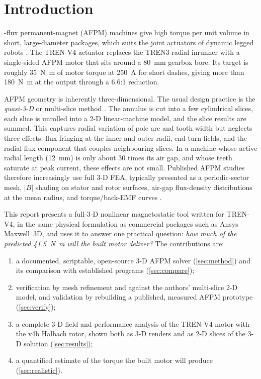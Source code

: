 \documentclass[journal]{IEEEtran}
\newcommand{\Nm}{\si{\newton\metre}}
\begin{document}
\section{Introduction}
-flux permanent-magnet (AFPM) machines give high torque per unit volume in short, large-diameter packages, which suits the joint actuators of dynamic legged robots \cite{gieras2008,aydin2004}. The TREN-V4 actuator replaces the TREN3 radial inrunner with a single-sided AFPM motor that sits around a \SI{80}{mm} gearbox bore. Its target is roughly \SI{35}{\Nm} of motor torque at \SI{250}{A} for short dashes, giving more than \SI{180}{\Nm} at the output through a 6.6:1 reduction.

AFPM geometry is inherently three-dimensional. The usual design practice is the \emph{quasi-3-D} or multi-slice method \cite{parviainen2005,gieras2008}. The annulus is cut into a few cylindrical slices, each slice is unrolled into a 2-D linear-machine model, and the slice results are summed. This captures radial variation of pole arc and tooth width but neglects three effects: flux fringing at the inner and outer radii, end-turn fields, and the radial flux component that couples neighbouring slices. In a machine whose active radial length (\SI{12}{mm}) is only about 30 times its air gap, and whose teeth saturate at peak current, these effects are not small. Published AFPM studies therefore increasingly use full 3-D FEA, typically presented as a periodic-sector mesh, $|B|$ shading on stator and rotor surfaces, air-gap flux-density distributions at the mean radius, and torque/back-EMF curves \cite{inwheel2021,magshape2018,wind2017,bench2122}.

This report presents a full-3-D nonlinear magnetostatic tool written for TREN-V4, in the same physical formulation as commercial packages such as Ansys Maxwell~3D, and uses it to answer one practical question: \emph{how much of the predicted \SI{41.5}{\Nm} will the built motor deliver?} The contributions are:
\begin{enumerate}
\item a documented, scriptable, open-source 3-D AFPM solver (\cref{sec:method}) and its comparison with established programs (\cref{sec:compare});
\item verification by mesh refinement and against the authors' multi-slice 2-D model, and validation by rebuilding a published, measured AFPM prototype (\cref{sec:verify});
\item a complete 3-D field and performance analysis of the TREN-V4 motor with the v4b Halbach rotor, shown both as 3-D renders and as 2-D slices of the 3-D solution (\cref{sec:results});
\item a quantified estimate of the torque the built motor will produce (\cref{sec:realistic}).
\end{enumerate}
\end{document}
